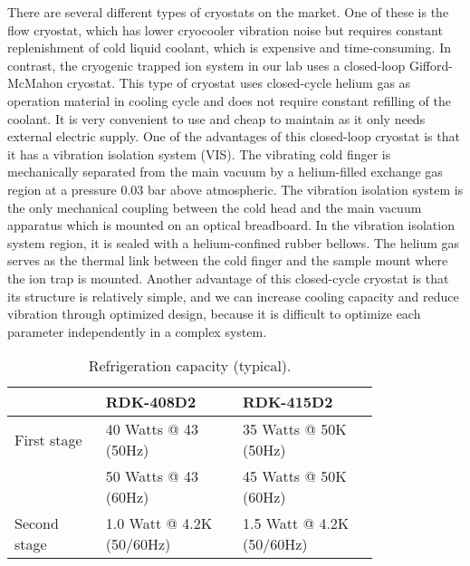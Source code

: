 There are several different types of cryostats on the market. One of these is the flow cryostat, which has lower cryocooler vibration noise but requires constant replenishment of cold liquid coolant, which is expensive and time-consuming. In contrast, the cryogenic trapped ion system in our lab uses a closed-loop Gifford-McMahon cryostat. This type of cryostat uses closed-cycle helium gas as operation material in cooling cycle and does not require constant refilling of the coolant. It is very convenient to use and cheap to maintain as it only needs external electric supply.
One of the advantages of this closed-loop cryostat is that it has a vibration isolation system (VIS). The vibrating cold finger is mechanically separated from the main vacuum by a helium-filled exchange gas region at a pressure 0.03 bar above atmospheric. The vibration isolation system is the only mechanical coupling between the cold head and the main vacuum apparatus which is mounted on an optical breadboard. In the vibration isolation system region, it is sealed with a helium-confined rubber bellows. The helium gas serves as the thermal link between the cold finger and the sample mount where the ion trap is mounted. Another advantage of this closed-cycle cryostat is that its structure is relatively simple, and we can increase cooling capacity and reduce vibration through optimized design, because it is difficult to optimize each parameter independently in a complex system.

\begin{table}
    \centering
    \caption{Refrigeration capacity (typical).}
    \begin{tabular}{p{0.2\linewidth}p{0.3\linewidth}p{0.3\linewidth}}
        \toprule
                     & RDK-408D2                 & RDK-415D2                 \\
        \midrule
        First stage  & 40 Watts @ 43 (50Hz)      & 35 Watts @ 50K (50Hz)     \\
                     & 50 Watts @ 43 (60Hz)      & 45 Watts @ 50K (60Hz)     \\
        Second stage & 1.0 Watt @ 4.2K (50/60Hz) & 1.5 Watt @ 4.2K (50/60Hz) \\
        \bottomrule
    \end{tabular}
    \label{tab:refrigeration_capacity}
\end{table}

